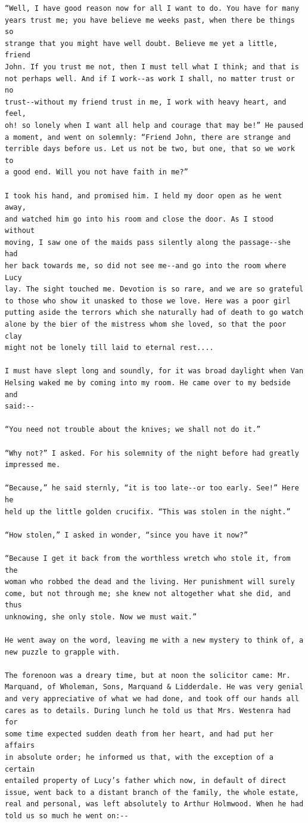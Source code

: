 \documentclass{article}
\begin{document}
\begin{verbatim}
“Well, I have good reason now for all I want to do. You have for many
years trust me; you have believe me weeks past, when there be things so
strange that you might have well doubt. Believe me yet a little, friend
John. If you trust me not, then I must tell what I think; and that is
not perhaps well. And if I work--as work I shall, no matter trust or no
trust--without my friend trust in me, I work with heavy heart, and feel,
oh! so lonely when I want all help and courage that may be!” He paused
a moment, and went on solemnly: “Friend John, there are strange and
terrible days before us. Let us not be two, but one, that so we work to
a good end. Will you not have faith in me?”

I took his hand, and promised him. I held my door open as he went away,
and watched him go into his room and close the door. As I stood without
moving, I saw one of the maids pass silently along the passage--she had
her back towards me, so did not see me--and go into the room where Lucy
lay. The sight touched me. Devotion is so rare, and we are so grateful
to those who show it unasked to those we love. Here was a poor girl
putting aside the terrors which she naturally had of death to go watch
alone by the bier of the mistress whom she loved, so that the poor clay
might not be lonely till laid to eternal rest....

I must have slept long and soundly, for it was broad daylight when Van
Helsing waked me by coming into my room. He came over to my bedside and
said:--

“You need not trouble about the knives; we shall not do it.”

“Why not?” I asked. For his solemnity of the night before had greatly
impressed me.

“Because,” he said sternly, “it is too late--or too early. See!” Here he
held up the little golden crucifix. “This was stolen in the night.”

“How stolen,” I asked in wonder, “since you have it now?”

“Because I get it back from the worthless wretch who stole it, from the
woman who robbed the dead and the living. Her punishment will surely
come, but not through me; she knew not altogether what she did, and thus
unknowing, she only stole. Now we must wait.”

He went away on the word, leaving me with a new mystery to think of, a
new puzzle to grapple with.

The forenoon was a dreary time, but at noon the solicitor came: Mr.
Marquand, of Wholeman, Sons, Marquand & Lidderdale. He was very genial
and very appreciative of what we had done, and took off our hands all
cares as to details. During lunch he told us that Mrs. Westenra had for
some time expected sudden death from her heart, and had put her affairs
in absolute order; he informed us that, with the exception of a certain
entailed property of Lucy’s father which now, in default of direct
issue, went back to a distant branch of the family, the whole estate,
real and personal, was left absolutely to Arthur Holmwood. When he had
told us so much he went on:--


\end{verbatim}
\end{document}

